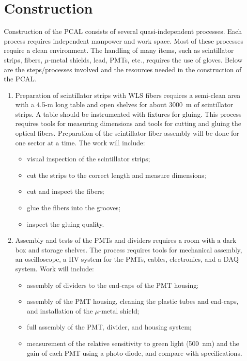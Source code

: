 \section{Construction}

Construction of the PCAL consists of several quasi-independent
processes.  Each process requires independent manpower and work
space.  Most of these processes require a clean environment.  The
handling of many items, such as scintillator strips, fibers, 
$\mu$-metal shields, lead, PMTs, etc., requires the use of gloves. 
Below are the steps/processes involved and the resources needed in 
the construction of the PCAL.

\begin{enumerate}

\item Preparation of scintillator strips with WLS fibers requires a
semi-clean area with a 4.5-m long table and open shelves for about 
3000~m of scintillator strips.  A table should be instrumented with 
fixtures for gluing.  This process requires tools for measuring 
dimensions and tools for cutting and gluing the optical fibers. 
Preparation of the scintillator-fiber assembly will be done for one 
sector at a time.  The work will include:  

  \begin{itemize}
    \item visual inspection of the scintillator strips;
    \item cut the strips to the correct length and measure dimensions;
    \item cut and inspect the fibers;
    \item glue the fibers into the grooves;
    \item inspect the gluing quality.
  \end{itemize}

\item Assembly and tests of the PMTs and dividers requires a room with 
a dark box and storage shelves. The process requires tools for mechanical 
assembly, an oscilloscope, a HV system for the PMTs, cables, electronics,
and a DAQ system.  Work will include:  

  \begin{itemize}
    \item assembly of dividers to the end-caps of the PMT housing;   
    \item assembly of the PMT housing, cleaning the plastic tubes
          and end-caps, and installation of the $\mu$-metal shield;   
    \item full assembly of the PMT, divider, and housing system;
    \item measurement of the relative sensitivity to green light (500~nm) 
          and the gain of each PMT using a photo-diode, and compare with 
          specifications.
  \end{itemize}


\end{enumerate}
